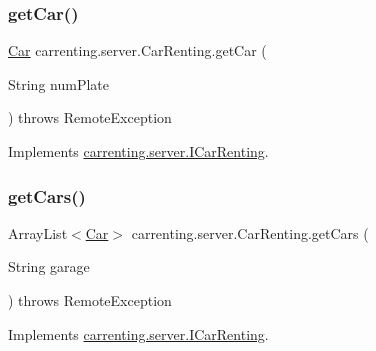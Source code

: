 \mbox{\label{classcarrenting_1_1server_1_1_car_renting_a7f49dd67da8352a564161f9a164523cf}} 
\subsubsection{\texorpdfstring{getCar()}{getCar()}}
{\footnotesize\ttfamily \mbox{\hyperlink{classcarrenting_1_1server_1_1jdo_1_1_car}{Car}} carrenting.\+server.\+Car\+Renting.\+get\+Car (\begin{DoxyParamCaption}\item[{String}]{num\+Plate }\end{DoxyParamCaption}) throws Remote\+Exception}



Implements \mbox{\hyperlink{interfacecarrenting_1_1server_1_1_i_car_renting_aa4d89c769e75b73df2a85805ea90bb49}{carrenting.\+server.\+I\+Car\+Renting}}.

\mbox{\label{classcarrenting_1_1server_1_1_car_renting_a11dd014dde29a6d25450e6269ddb78c7}} 
\subsubsection{\texorpdfstring{getCars()}{getCars()}}
{\footnotesize\ttfamily Array\+List$<$\mbox{\hyperlink{classcarrenting_1_1server_1_1jdo_1_1_car}{Car}}$>$ carrenting.\+server.\+Car\+Renting.\+get\+Cars (\begin{DoxyParamCaption}\item[{String}]{garage }\end{DoxyParamCaption}) throws Remote\+Exception}



Implements \mbox{\hyperlink{interfacecarrenting_1_1server_1_1_i_car_renting_aeaa26a483ce5e53faab84b0e3be0f7c9}{carrenting.\+server.\+I\+Car\+Renting}}.

\mbox{\label{classcarrenting_1_1server_1_1_car_renting_a65886cbac0c23f1dd39c1b2bf5daec25}} 
